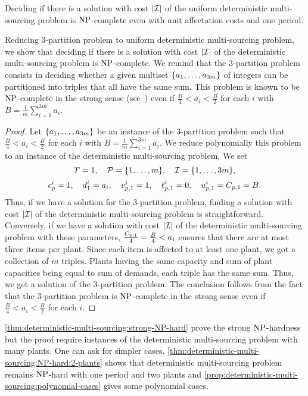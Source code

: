 \begin{thm}\label{thm:deterministic-multi-sourcing:strong-NP-hard}
Deciding if there is a solution with cost $\card{\REF}$ of the uniform deterministic multi-sourcing problem is $\operatorname{NP}$-complete even with unit affectation costs and one period.
\end{thm}


Reducing 3-partition problem to uniform deterministic multi-sourcing problem, we show that deciding if there is a solution with cost $\card{\REF}$ of the deterministic multi-sourcing problem is $\operatorname{NP}$-complete. We remind that the 3-partition problem consists in deciding whether a given multiset $\crbracket{a_1,\ldots,a_{3m}}$ of integers can be partitioned into triples that all have the same sum. This problem is known to be $\operatorname{NP}$-complete in the strong sense (see~\cite{Garey1979}) even if $\frac{B}{4} < a_i < \frac{B}{2}$ for each $i$ with $B=\frac{1}{m}\sum_{i=1}^{3m}a_i$.



\begin{proof}
Let $\crbracket{a_1,\ldots,a_{3m}}$ be an instance of the 3-partition problem such that $\frac{B}{4} < a_i < \frac{B}{2}$ for each $i$ with $B=\frac{1}{m}\sum_{i=1}^{3m}a_i$.
We reduce polynomially this problem to an instance of the deterministic multi-sourcing problem.
We set
$$
  \horizon=1
  ,\quad
  \plants=\range[1]{m}
  ,\quad
  \REF=\range[1]{3m},
$$
$$
  c_p^i=1
  ,\quad
  d_1^i=a_i
  ,\quad
  v_{p,1}^i=1
  ,\quad
  \ell_{p,1}^i=0
  ,\quad
  u_{p,1}^i=C_{p,1}=B.
$$
Thus, if we have a solution for the 3-partition problem, finding a solution with cost $\card{\REF}$ of the deterministic multi-sourcing problem is straightforward.
Conversely, if we have a solution with cost $\card{\REF}$ of the deterministic multi-sourcing problem with these parameters, $\frac{C_{p,1}}{4}=\frac{B}{4} < a_i$ ensures that there are at most three items per plant.
Since each item is affected to at least one plant, we got a collection of $m$ triples.
Plants having the same capacity and sum of plant capacities being equal to sum of demands, each triple has the same sum.
Thus, we get a solution of the 3-partition problem.
The conclusion follows from the fact that the 3-partition problem is $\operatorname{NP}$-complete in the strong sense even if $\frac{B}{4} < a_i < \frac{B}{2}$ for each $i$.
\end{proof}


\cref{thm:deterministic-multi-sourcing:strong-NP-hard} prove the strong $\operatorname{NP}$-hardness but the proof require instances of the deterministic multi-sourcing problem with many plants.
One can ask for simpler cases.
\cref{thm:deterministic-multi-sourcing:NP-hard:2-plants} shows that deterministic multi-sourcing problem remains $\operatorname{NP}$-hard with one period and two plants and \cref{prop:deterministic-multi-sourcing:polynomial-cases} gives some polynomial cases.


